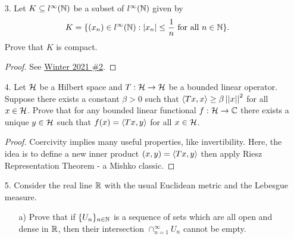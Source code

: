 \begin{itemize}
\begin{proof}
\begin{itemize}
    Clearly $c_0$ is a subspace of $l^\infty$. Let $x^{(k)} \in c_0$ converge to $y \in l^\infty$. Take $\varepsilon > 0$ and $N_0$ s.t. $\sup{|x_j^{(k)} - y_j|} < \varepsilon/2$ for all $k > N_0$. For each $k$, pick an $N_1$ s.t. $|x_j^{(k)}| < \varepsilon/2$ for all $j > N_1$. Thus, $|y_j| \leq |x_j^{(k)} - y_j| + |x_j^{(k)}| < \varepsilon$ for all $k > N_0$, $j > N_1$. Hence $y_j \rar 0$, so $y \in c_0$.
    
    \item[b)] We can see readily that $|f((x_n))| \leq ||(x_n)||_\infty$. For equality, we would \textit{like} to take the sequence of all $1$'s, but this is not in $c_0$. We can find a sequence however that gets us arbitrarily close: let $x^{(k)} = (1, 1, ..., 1, 0, 0, ...)$ with every term after the $k$-th being $0$. Then $|f(x^{(k)})| = 1 - 2^{-k}$, so taking $k \rar \infty$ gives $||f|| = 1$.
\end{itemize}\end{proof}




\item[3.] Let $K \subseteq l^\infty(\mathbb{N})$ be a subset of $l^\infty(\mathbb{N})$ given by 
\[K=\{(x_n) \in l^\infty(\mathbb{N}) : |x_n|\leq \frac{1}{n} \text{ for all } n \in \mathbb{N}\}.\]
Prove that $K$ is compact.
 
\begin{proof}
See \hyperref[q:w21-2]{Winter 2021 \#2}.
\end{proof}




\item[4.] Let $\mathcal{H}$ be a Hilbert space and $T:\mathcal{H} \rightarrow \mathcal{H}$ be a bounded linear operator. Suppose there exists a constant $\beta >0$ such that $\langle{}Tx,x\rangle \geq \beta \left|\left|{}x\right|\right|^2$ for all $x \in \mathcal{H}$. Prove that for any bounded linear functional $f:\mathcal{H} \rightarrow \mathbb{C}$ there exists a unique $y\in\mathcal{H}$ such that $f(x) = \langle{}Tx,y\rangle$ for all $x\in\mathcal{H}$.
 
\begin{proof}
Coercivity implies many useful properties, like invertibility. Here, the idea is to define a new inner product $(x,y) = \langle{}Tx,y\rangle$ then apply Riesz Representation Theorem - a Mishko classic.
\end{proof}



\item[5.] Consider the real line $\mathbb{R}$ with the usual Euclidean metric and the Lebesgue measure. 
\begin{itemize}
    \item[a)] Prove that if $\{U_n\}_{n\in\mathbb{N}}$ is a sequence of sets which are all open and dense in $\mathbb{R}$, then their intersection $\cap_{n=1}^\infty U_n$ cannot be empty.
    

\end{itemize}
\end{itemize}
